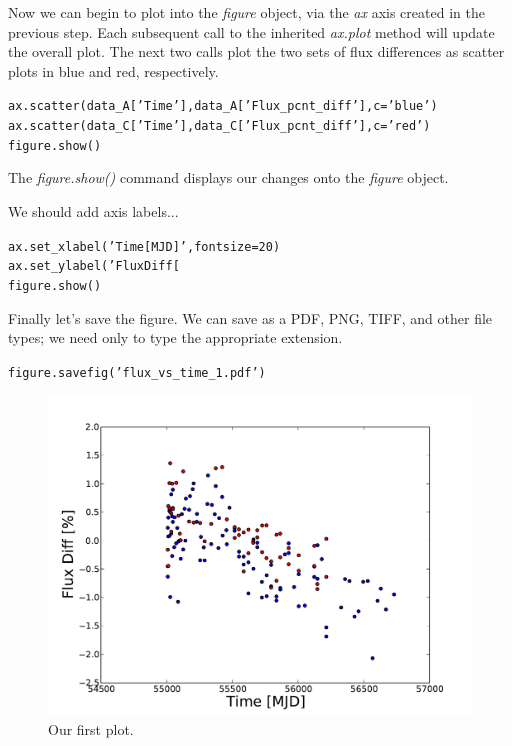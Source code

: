 Now we can begin to plot into the \textit{figure} object, via the \textit{ax} 
axis created in the previous step. Each subsequent call to the inherited 
\textit{ax.plot} method will update the overall plot. The next two calls
plot the two sets of flux differences as scatter plots in blue and red,
respectively.

\begin{alltt}
\pytab ax.scatter(data_A['Time'], data_A['Flux_pcnt_diff'], c='blue')
\pytab ax.scatter(data_C['Time'], data_C['Flux_pcnt_diff'], c='red')
\pytab figure.show()
\end{alltt}

The \textit{figure.show()} command displays our changes onto the \textit{figure}
object.

We should add axis labels...

\begin{alltt}
\pytab ax.set_xlabel('Time [MJD]', fontsize=20)
\pytab ax.set_ylabel('Flux Diff [%
\pytab figure.show()
\end{alltt}

Finally let's save the figure. We can save as a PDF, PNG, TIFF, and
other file types; we need only to type the appropriate extension.

\begin{alltt}
\pytab figure.savefig('flux_vs_time_1.pdf')
\end{alltt}


\begin{figure}[tbp]
  \centering
    \includegraphics[scale=0.55]{flux_vs_time_1.pdf}
    \caption{Our first plot.}
  \label{fig:flux_vs_time_1}
\end{figure}


